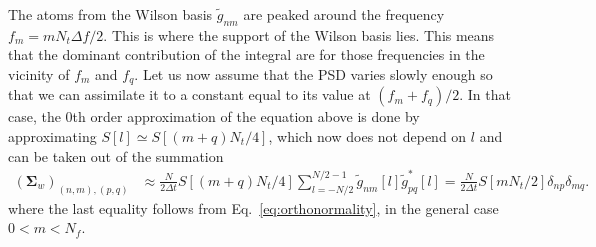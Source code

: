 \documentclass[twocolumn,preprintnumbers,
  superscriptaddress,
  nofootinbib,
  amsmath,
  amssymb,
  aps,
  prd,
  colorlinks=true,
  linkcolor=blue,
  urlcolor=blue,
  citecolor=blue,
  anchorcolor=blue
]{revtex4-2}
\begin{document}
The atoms from the Wilson basis $\tilde{g}_{nm}$ are peaked around the frequency $f_m = m N_t \Delta f/2$. This is where the support of the Wilson basis lies. This means that the dominant contribution of the integral are for those frequencies in the vicinity of $f_m$ and $f_q$. Let us now assume that the PSD varies slowly enough so that we can assimilate it to a constant equal to its value at $(f_m + f_q) / 2$. In that case, the 0th order approximation of the equation above is done by approximating $S\left[l\right]\simeq S\left[(m+q) N_t/ 4\right]$, which now does not depend on $l$ and can be taken out of the summation
%
\begin{align}
\label{eq:wdm-covariance-stationary}
(\boldsymbol{\Sigma}_w)_{(n,m),(p,q)} & \approx \frac{N}{2\Delta t} S\left[(m+q) N_t/ 4\right]\sum_{l=-N/2}^{N/2 - 1}\tilde{g}_{nm}[l] \tilde{g}_{pq}^{*}[l]=\frac{N}{2\Delta t} S\left[m N_t/ 2\right]\delta_{np}\delta_{mq}.
\end{align}
%
where the last equality follows from Eq.~\eqref{eq:orthonormality}, in the general case $0<m<N_f$.



\end{document}
